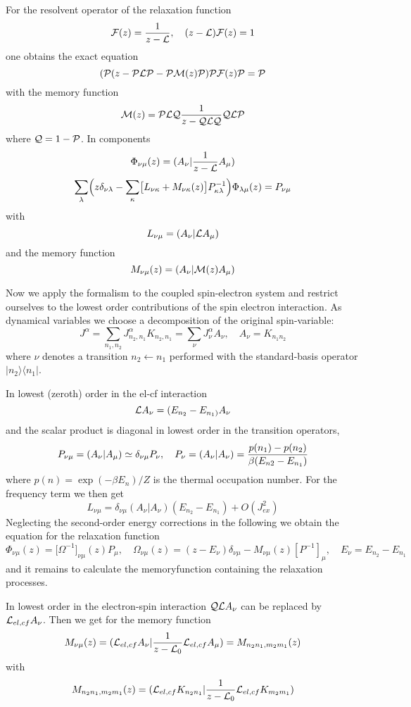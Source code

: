 For the  resolvent operator of the relaxation function
$$
{\cal F}(z)= {1\over {z-\cal L}}, \quad ({z-\cal L}){\cal F}(z)=1 
$$
one obtains the exact equation
$$
({\cal P}(z-{\cal P}{\cal L}{\cal P} - {\cal P} {\cal M}(z) {\cal P}){\cal P} {\cal
F}(z) {\cal P}= {\cal P}
$$
with the memory function
$$
{\cal M}(z)={\cal PLQ}{1\over z-{\cal QLQ} }{\cal QLP}
$$ 
where ${\cal Q}=1-{\cal P}$. In components
$$
\Phi_{\nu\mu}(z)= (A_\nu\vert {1\over z-{\cal L}} A_\mu)
$$
$$
\sum_\lambda \Bigl(z\delta_{\nu\lambda}-\sum_\kappa\bigl[L_{\nu\kappa}+
M_{\nu\kappa}(z)\bigr]P^{-1}_{\kappa\lambda}\Bigr)\Phi_{\lambda\mu}(z)
=P_{\nu \mu}
$$
with
$$
L_{\nu\mu}=(A_\nu\vert {\cal L}A_\mu)
$$
and the memory function 
$$
M_{\nu\mu}(z)=(A_\nu\vert{\cal M}(z)A_\mu)
$$

Now we apply the formalism to the coupled spin-electron system and restrict
ourselves to the lowest order contributions of the spin electron
interaction. As dynamical variables we choose a decomposition of the  
original spin-variable:
$$
J^\alpha=\sum_{n_1,n_2}J^\alpha_{n_2,n_1}K_{n_2,n_1}=\sum_\nu J^\alpha_\nu A_\nu, 
\quad 
A_\nu= K_{n_1n_2}   
$$
where $\nu$ denotes a transition $n_2 \gets n_1$ performed with the
standard-basis operator $\vert n_2\rangle\langle n_1\vert$. 

In lowest (zeroth) order in the el-cf interaction  
$$
{\cal L}A_\nu = (E_{n_2}-E_{n_1)}A_\nu
$$
and  the scalar product is diagonal in lowest order in the transition
operators,
$$
P_{\nu\mu}=(A_\nu\vert A_\mu)\simeq\delta_{\nu
\mu}P_\nu, \quad P_\nu=(A_\nu\vert
A_\nu)={p(n_1)-p(n_2)\over \beta (E_{n2}-E_{n_1})}
$$
where $p(n)=\exp(-\beta E_n)/Z$ is the thermal occupation number. For the
frequency term we then get 
$$
L_{\nu\mu}=\delta_{\nu\mu}(A_\nu\vert A_\nu) (E_{n_2}-E_{n_1} )
+O(J_{ex}^2)
$$
Neglecting the second-order energy corrections in the following we obtain
the equation for the relaxation function 
$$
\Phi_{\nu\mu}(z)=\bigl[\Omega^{-1}\bigr]_{\nu\mu}(z)
P_\mu, \quad
\Omega_{\nu\mu}(z)=(z-E_\nu)\delta_{\nu\mu} -
M_{\nu\mu}(z)[P^{-1}]_\mu, \quad
E_\nu = E_{n_2}- E_{n_1}
$$
and it remains to calculate the memoryfunction containing the relaxation
processes. 

In lowest order in the electron-spin interaction ${\cal QL}A_\nu$ can be replaced by ${\cal L}_{el,cf}A_\nu$.
Then we get for the memory function
$$
M_{\nu \mu}(z)= ({\cal L}_{el,cf}A_\nu \vert{1\over z- {\cal
L}_0}{\cal L}_{el,cf}A_\mu)=
M_{n_2n_1,m_2m_1}(z)
$$
with
$$
M_{n_2n_1,m_2m_1}(z)=({\cal L}_{el,cf} K_{n_2n_1}\vert{1\over z-{\cal
L}_0}{\cal L}_{el,cf} K_{m_2m_1})
$$

